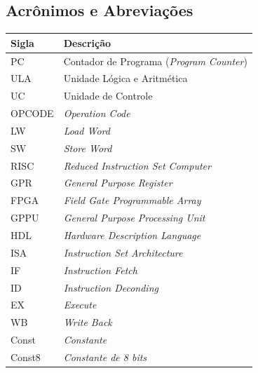 \documentclass{article}
\begin{document}
  \subsection{Acrônimos e Abreviações}
    \FloatBarrier
    \begin{table}[H]
      \begin{center}
        \begin{tabular}[pos]{|m{2cm} | m{12cm}|} 
          \hline
          \cellcolor[gray]{0.9}\textbf{Sigla} & \cellcolor[gray]{0.9}\textbf{Descrição} \\ \hline
             PC       &  Contador de Programa (\textit{Program Counter})\\ \hline
             ULA      &  Unidade Lógica e Aritmética\\ \hline
             UC      &  Unidade de Controle\\ \hline
             OPCODE  &  \textit{Operation Code}\\ \hline
             LW      &  \textit{Load Word}\\ \hline
             SW      &  \textit{Store Word}\\ \hline
             RISC     & \textit{Reduced Instruction Set Computer}\\ \hline
             GPR    &   \textit{General Purpose Register}\\ \hline
             FPGA   & \textit{Field Gate Programmable Array}\\ \hline
             GPPU   & \textit{General Purpose Processing Unit}\\ \hline
             HDL    & \textit{Hardware Description Language}\\ \hline
             ISA    & \textit{Instruction Set Architecture}\\ \hline
             IF     & \textit{Instruction Fetch}\\ \hline
             ID     & \textit{Instruction Deconding}\\ \hline
             EX     & \textit{Execute}\\ \hline
             WB     & \textit{Write Back}\\ \hline
             Const  & \textit{Constante}\\ \hline
             Const8 & \textit{Constante de 8 bits}\\ \hline
        \end{tabular}
      \end{center}
    \end{table}  
  
\end{document}
